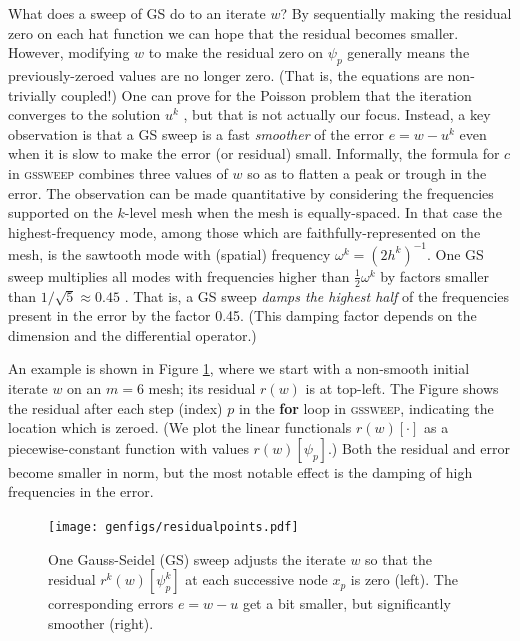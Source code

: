 \documentclass[letterpaper,final,12pt,reqno]{amsart}
\numberwithin{equation}{section}
\numberwithin{figure}{section}
\numberwithin{table}{section}
\begin{document}
What does a sweep of GS do to an iterate $w$?  By sequentially making the residual zero on each hat function we can hope that the residual becomes smaller.  However, modifying $w$ to make the residual zero on $\psi_p$ generally means the previously-zeroed values are no longer zero.  (That is, the equations are non-trivially coupled!)  One can prove for the Poisson problem that the iteration converges to the solution $u^k$ \cite[for example]{Greenbaum1997}, but that is not actually our focus.  Instead, a key observation is that a GS sweep is a fast \emph{smoother} of the error $e=w-u^k$ even when it is slow to make the error (or residual) small.  Informally, the formula for $c$ in \textsc{gssweep} combines three values of $w$ so as to flatten a peak or trough in the error.  The observation can be made quantitative by considering the frequencies supported on the $k$-level mesh when the mesh is equally-spaced.  In that case the highest-frequency mode, among those which are faithfully-represented on the mesh, is the sawtooth mode with (spatial) frequency $\omega^k=(2h^k)^{-1}$.  One GS sweep multiplies all modes with frequencies higher than $\frac{1}{2} \omega^k$ by factors smaller than $1/\sqrt{5}\approx 0.45$ \cite[Chapter 4]{Briggsetal2000}.  That is, a GS sweep \emph{damps the highest half} of the frequencies present in the error by the factor 0.45.  (This damping factor depends on the dimension and the differential operator.)

An example is shown in Figure \ref{fig:residualpoints}, where we start with a non-smooth initial iterate $w$ on an $m=6$ mesh; its residual $r(w)$ is at top-left.  The Figure shows the residual after each step (index) $p$ in the \textbf{for} loop in \textsc{gssweep}, indicating the location which is zeroed.  (We plot the linear functionals $r(w)[\cdot]$ as a piecewise-constant function with values $r(w)[\psi_p]$.)  Both the residual and error become smaller in norm, but the most notable effect is the damping of high frequencies in the error.

\begin{figure}[t]
\texttt{[image: genfigs/residualpoints.pdf]}
\caption{One Gauss-Seidel (GS) sweep adjusts the iterate $w$ so that the residual $r^k(w)[\psi_p^k]$ at each successive node $x_p$ is zero (left).  The corresponding errors $e=w-u$ get a bit smaller, but significantly smoother (right).}
\label{fig:residualpoints}
\end{figure}
\end{document}
